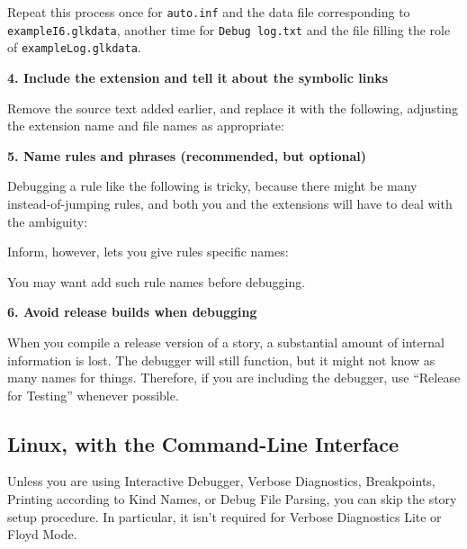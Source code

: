 \documentclass{book}
\newcommand{\lastpagebreak}{\vfill\pagebreak}
\begin{document}
Repeat this process once for \texttt{auto.inf} and the data file corresponding
to \texttt{exampleI6.glkdata}, another time for \texttt{Debug log.txt} and the
file filling the role of \texttt{exampleLog.glkdata}.

\lastpagebreak

\textbf{4. Include the extension and tell it about the symbolic links}

Remove the source text added earlier, and replace it with the following,
adjusting the extension name and file names as appropriate:

\begin{quote}
  
\end{quote}

\textbf{5. Name rules and phrases (recommended, but optional)}

Debugging a rule like the following is tricky, because there might be many
instead-of-jumping rules, and both you and the extensions will have to deal with
the ambiguity:

\begin{quote}
  
\end{quote}

Inform, however, lets you give rules specific names:

\begin{quote}
  
\end{quote}

You may want add such rule names before debugging.

\textbf{6. Avoid release builds when debugging}

When you compile a release version of a story, a substantial amount of internal
information is lost.  The debugger will still function, but it might not know as
many names for things.  Therefore, if you are including the debugger, use
``Release for Testing'' whenever possible.

\lastpagebreak

\subsection{Linux, with the Command-Line Interface}

Unless you are using Interactive Debugger, Verbose Diagnostics, Breakpoints,
Printing according to Kind Names, or Debug File Parsing, you can skip the story
setup procedure.  In particular, it isn't required for Verbose Diagnostics Lite
or Floyd Mode.
\end{document}
